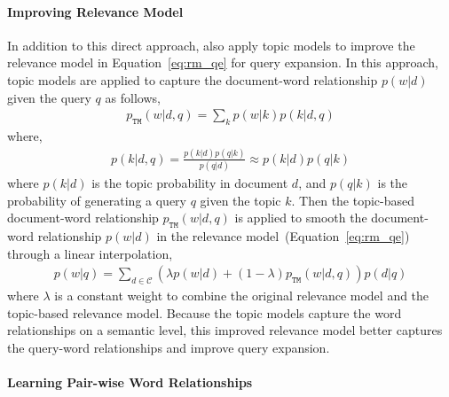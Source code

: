 \paragraph{Improving Relevance Model}

In addition to this direct approach, \citet{Yi-2009} also apply topic
models to improve the relevance model in Equation~\ref{eq:rm_qe} for
query expansion. In this approach, topic models are applied to capture
the document-word relationship $p(w|d)$ given the query $q$ as
follows,
\begin{align}
p_{\texttt{TM}}(w|d,q) = \sum_k p(w|k) p(k|d,q)
\end{align}
where,
\begin{align}
p(k|d,q) = \frac{p(k|d)p(q|k)}{p(q|d)} \approx p(k|d)p(q|k)
\end{align}
where $p(k|d)$ is the topic probability in document $d$, and $p(q|k)$
is the probability of generating a query $q$ given the topic $k$. Then
the topic-based document-word relationship $p_{\texttt{TM}}(w|d,q)$ is
applied to smooth the document-word relationship $p(w|d)$ in the
relevance model~(Equation~\ref{eq:rm_qe}) through a linear
interpolation,
\begin{align}
p(w|q) = \sum_{d \in \mathcal{C}} (\lambda p(w|d) + (1 - \lambda)p_{\texttt{TM}}(w|d,q))p(d|q)
\end{align}
where $\lambda$ is a constant weight to combine the original relevance
model and the topic-based relevance model. Because the topic models
capture the word relationships on a semantic level, this improved
relevance model better captures the query-word relationships and
improve query expansion.

\paragraph{Learning Pair-wise Word Relationships}

